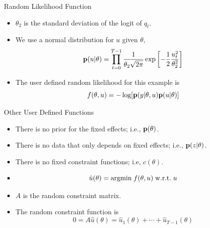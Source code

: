 \documentclass{beamer}
\newcommand{\B}[1]{{\bf #1}}
\newcommand{\R}[1]{{\rm #1}}
\begin{document}
\begin{frame}{Random Likelihood Function}
\begin{itemize}

\item
$\theta_2$ is the standard deviation of the logit of $q_t$.
\pause

\item
We use a normal distribution for $u$ given $\theta$,
\[
\B{p} ( u | \theta )
=
\prod_{t=0}^{T-1}
    \frac{1}{ \theta_2 \sqrt{ 2 \pi } }
        \exp \left[ - \frac{1}{2} \frac{ u_t^2 }{ \theta_2^2 } \right]
\]
\pause

\item
The user defined random likelihood for this example is
\[
f( \theta , u )
=
- \log [ \B{p} ( y | \theta , u) \B{p} ( u | \theta ) ]
\]

\end{itemize}
\end{frame}
\begin{frame}{Other User Defined Functions}
\begin{itemize}

\item
There is no prior for the fixed effects; i.e.,
$\B{p}( \theta )$.
\pause

\item
There is no data that only depends on fixed effects; i.e.,
$\B{p}(z| \theta )$.
\pause

\item
There is no fixed constraint functions; i.e,
$c( \theta )$.
\pause

\item
\[
\hat{u} ( \theta ) = \R{argmin} \; f( \theta , u ) \; \R{w.r.t.} \; u
\]
\pause

\item
$A$ is the random constraint matrix.

\item
The random constraint function is
\[
0
=
A \hat{u} ( \theta )
=
\hat{u}_1 ( \theta ) + \cdots + \hat{u}_{T-1} ( \theta )
\]

\end{itemize}
\end{frame}
\end{document}
